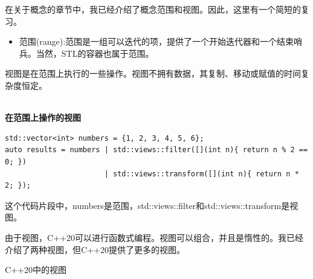 在关于概念的章节中，我已经介绍了概念范围和视图。因此，这里有一个简短的复习。

\begin{itemize}
\item 
范围(range):范围是一组可以迭代的项，提供了一个开始迭代器和一个结束哨兵。当然，STL的容器也属于范围。
\end{itemize}

视图是在范围上执行的一些操作。视图不拥有数据，其复制、移动或赋值的时间复杂度恒定。

\hspace*{\fill} \\ %
\noindent
\textbf{在范围上操作的视图}
\begin{lstlisting}[style=styleCXX]
std::vector<int> numbers = {1, 2, 3, 4, 5, 6};
auto results = numbers | std::views::filter([](int n){ return n % 2 == 0; })
                       | std::views::transform([](int n){ return n * 2; });
\end{lstlisting}

这个代码片段中，numbers是范围，std::views::filter和std::views::transform是视图。

由于视图，C++20可以进行函数式编程。视图可以组合，并且是惰性的。我已经介绍了两种视图，但C++20提供了更多的视图。


\begin{center}
C++20中的视图
\end{center}

